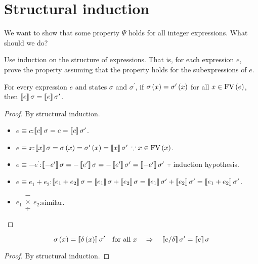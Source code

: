 \section{Structural induction}
\begin{enumcirc}
	\item
	We want to show that some property $\Psi$ holds for all integer expressions.
	What should we do?
	\item
	Use induction on the structure of expressions.
	That is, for each expression $e$, prove the property assuming that the property
	holds for the subexpressions of $e$.
	\begin{lemma}[Coincidence]
		For every expression $e$ and states $\sigma$ and $\sigma^\prime$,
		if $\sigma\left( x \right) = \sigma^\prime\left( x \right)$ for all $x \in \textrm{FV}\left(  e  \right)$,
		then $\left\llbracket e \right\rrbracket\sigma = \left\llbracket e \right\rrbracket\sigma^\prime$.
	\end{lemma}
	\begin{proof}
		By structural induction.
		\begin{itemize}
			\item $e \equiv c$\;:\quad $\left\llbracket c \right\rrbracket\sigma = c = \left\llbracket c \right\rrbracket\sigma^\prime$.
			\item $e \equiv x$\;:\quad $\left\llbracket x \right\rrbracket\sigma = \sigma\left( x \right) =
				      \sigma^\prime\left( x \right) = \left\llbracket x \right\rrbracket\sigma^\prime$ $\because x \in \textrm{FV}\left(  x  \right)$.
			\item $e \equiv -e^\prime$\;:\quad $\left\llbracket -e^\prime \right\rrbracket\sigma =
				      -\left\llbracket e^\prime \right\rrbracket\sigma = -\left\llbracket e^\prime \right\rrbracket\sigma^\prime =
				      \left\llbracket -e^\prime \right\rrbracket\sigma^\prime$ $\because$ induction hypothesis.
			\item $e \equiv e_1 + e_2$\;:\quad $\left\llbracket e_1 + e_2 \right\rrbracket\sigma =
				      \left\llbracket e_1 \right\rrbracket\sigma + \left\llbracket e_2 \right\rrbracket\sigma =
				      \left\llbracket e_1 \right\rrbracket\sigma^\prime + \left\llbracket e_2 \right\rrbracket\sigma^\prime =
				      \left\llbracket e_1 + e_2 \right\rrbracket\sigma^\prime$.
			\item $e_1 \substack{-\\\times\\\div} e_2$\;:\quad similar.
		\end{itemize}
	\end{proof}

	\begin{lemma}[Substitution]
		\[
			\sigma\left( x \right) = \left\llbracket \delta\left( x \right) \right\rrbracket\sigma^\prime \quad \textrm{for all } x
			\quad \Rightarrow \quad \left\llbracket e/\delta \right\rrbracket\sigma^\prime = \left\llbracket e \right\rrbracket\sigma
		\]
	\end{lemma}
	\begin{proof}
		By structural induction.
	\end{proof}


\end{enumcirc}
